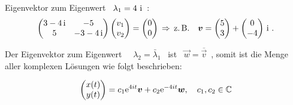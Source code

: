 {\begin{iii}
Eigenvektor zum Eigenwert \ $\lambda _{1}=4\,\imag$\ : 
\[
\begin{pmatrix}
3-4\,\text{i} & -5 \\ 
5 & -3-4\,\text{i}
\end{pmatrix}\begin{pmatrix}
v_{1} \\ 
v_{2}
\end{pmatrix}=\begin{pmatrix}
0 \\ 
0
\end{pmatrix} \,\Rightarrow\, \text{z.\,B.}\quad 
\vec{v}=\begin{pmatrix}
5 \\ 
3
\end{pmatrix} + \begin{pmatrix}
0 \\ 
-4
\end{pmatrix} \,\text{i}\ . 
\]

Der Eigenvektor zum Eigenwert \ \ $\lambda _{2}=\bar{\lambda}_{1}$ \ ist \ 
$
\vec{w}=\overline{\vec{v}}$\ , somit ist die Menge aller komplexen Lösungen wie folgt beschrieben:

\[\begin{pmatrix}
x(t) \\ 
y(t)
\end{pmatrix}=c_1\EH{4it}\vec{v}+c_2\EH{-4it}\vec{w},\quad c_1,c_2\in\mathbb{C}\]


\end{iii}}
